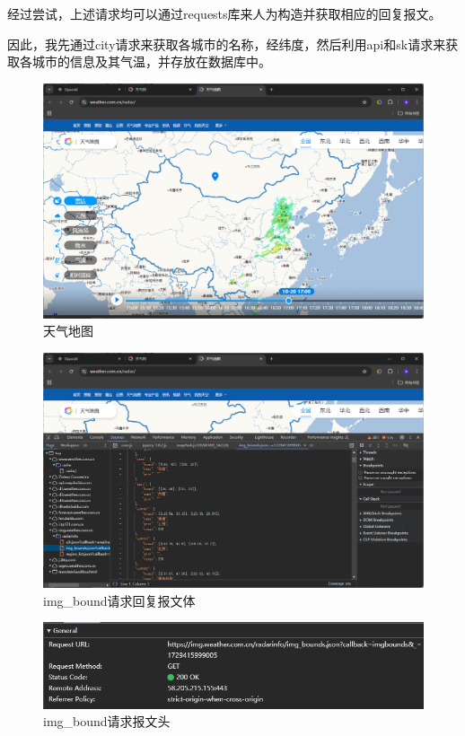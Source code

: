 经过尝试，上述请求均可以通过requests库来人为构造并获取相应的回复报文。

因此，我先通过city请求来获取各城市的名称，经纬度，然后利用api和sk请求来获取各城市的信息及其气温，并存放在数据库中。

\begin{figure}[!htbp]
    \centering
    \includegraphics[width=\textwidth]{figures/weathermap.png}
    \caption{天气地图}\label{weathermap}
\end{figure}

\begin{figure}[!htbp]
    \centering
    \includegraphics[width=\textwidth]{figures/image_bound_content.png}
    \caption{img\_bound请求回复报文体}\label{imgboundcontent}
\end{figure}

\begin{figure}[!htbp]
    \centering
    \includegraphics[width=\textwidth]{figures/image_bound_head.png}
    \caption{img\_bound请求报文头}\label{imgboundhead}
\end{figure}

